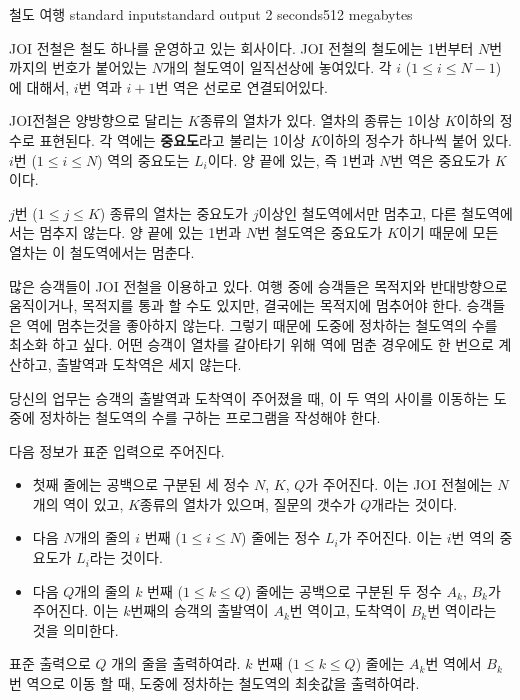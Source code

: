 \begin{problem}{철도 여행}
	{standard input}{standard output}
	{2 seconds}{512 megabytes}{}
	
	JOI 전철은 철도 하나를 운영하고 있는 회사이다. JOI 전철의 철도에는 1번부터 $N$번 까지의 번호가 붙어있는 $N$개의 철도역이 일직선상에 놓여있다. 각 $i$ ($1 \le i \le N-1$)에 대해서, $i$번 역과 $i+1$번 역은 선로로 연결되어있다.
	
	JOI전철은 양방향으로 달리는 $K$종류의 열차가 있다. 열차의 종류는 1이상 $K$이하의 정수로 표현된다. 각 역에는 \textbf{중요도}라고 불리는 1이상 $K$이하의 정수가 하나씩 붙어 있다. $i$번 ($1 \le i \le N$) 역의 중요도는 $L_i$이다. 양 끝에 있는, 즉 1번과 $N$번 역은 중요도가 $K$이다.
	
	$j$번 ($1 \le j \le K$) 종류의 열차는 중요도가 $j$이상인 철도역에서만 멈추고, 다른 철도역에서는 멈추지 않는다. 양 끝에 있는 1번과 $N$번 철도역은 중요도가 $K$이기 때문에 모든 열차는 이 철도역에서는 멈춘다.
	
	많은 승객들이 JOI 전철을 이용하고 있다. 여행 중에 승객들은 목적지와 반대방향으로 움직이거나, 목적지를 통과 할 수도 있지만, 결국에는 목적지에 멈추어야 한다. 승객들은 역에 멈추는것을 좋아하지 않는다. 그렇기 때문에 도중에 정차하는 철도역의 수를 최소화 하고 싶다. 어떤 승객이 열차를 갈아타기 위해 역에 멈춘 경우에도 한 번으로 계산하고, 출발역과 도착역은 세지 않는다.
	
	당신의 업무는 승객의 출발역과 도착역이 주어졌을 때, 이 두 역의 사이를 이동하는 도중에 정차하는 철도역의 수를 구하는 프로그램을 작성해야 한다.
	
	\InputFile
	
	다음 정보가 표준 입력으로 주어진다.
	
	\begin{itemize}
		\item 첫째 줄에는 공백으로 구분된 세 정수 $N$, $K$, $Q$가 주어진다. 이는 JOI 전철에는 $N$개의 역이 있고, $K$종류의 열차가 있으며, 질문의 갯수가 $Q$개라는 것이다.
		\item 다음 $N$개의 줄의 $i$ 번째 ($1 \le i \le N$) 줄에는 정수 $L_i$가 주어진다. 이는 $i$번 역의 중요도가 $L_i$라는 것이다.
		\item 다음 $Q$개의 줄의 $k$ 번째 ($1 \le k \le Q$) 줄에는 공백으로 구분된 두 정수 $A_k$, $B_k$가 주어진다. 이는 $k$번째의 승객의 출발역이 $A_k$번 역이고, 도착역이 $B_k$번 역이라는 것을 의미한다.
	\end{itemize}
	
	
	\OutputFile
	
	표준 출력으로 $Q$ 개의 줄을 출력하여라. $k$ 번째 ($1 \le k \le Q$) 줄에는 $A_k$번 역에서 $B_k$번 역으로 이동 할 때, 도중에 정차하는 철도역의 최솟값을 출력하여라.
	

\end{problem}
